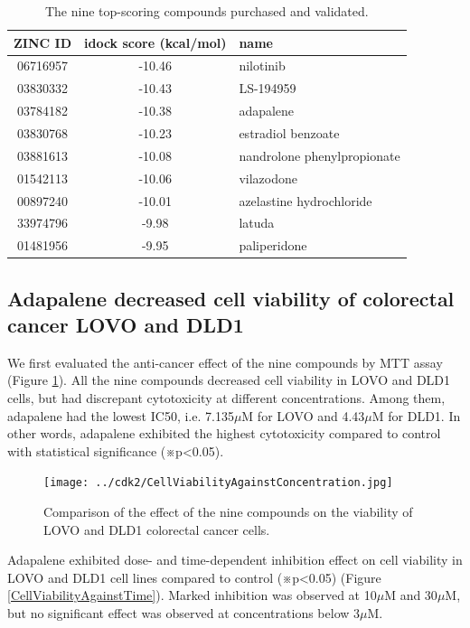 \documentclass[10pt]{article}
\begin{document}
\begin{table}
\caption{The nine top-scoring compounds purchased and validated.}
\label{Top9}
\begin{tabular}{ccl}
\hline
ZINC ID & idock score (kcal/mol) & name\\
\hline
06716957 & -10.46 & nilotinib\\
03830332 & -10.43 & LS-194959\\
03784182 & -10.38 & adapalene\\
03830768 & -10.23 & estradiol benzoate\\
03881613 & -10.08 & nandrolone phenylpropionate\\
01542113 & -10.06 & vilazodone\\
00897240 & -10.01 & azelastine hydrochloride\\
33974796 &  -9.98 & latuda\\
01481956 &  -9.95 & paliperidone\\
\hline
\end{tabular}
\end{table}

\subsection*{Adapalene decreased cell viability of colorectal cancer LOVO and DLD1}

We first evaluated the anti-cancer effect of the nine compounds by MTT assay (Figure \ref{CellViabilityAgainstConcentration}). All the nine compounds decreased cell viability in LOVO and DLD1 cells, but had discrepant cytotoxicity at different concentrations. Among them, adapalene had the lowest IC50, i.e. 7.135$\mu$M for LOVO and 4.43$\mu$M for DLD1. In other words, adapalene exhibited the highest cytotoxicity compared to control with statistical significance (※p<0.05).

\begin{figure}
\centering
\texttt{[image: ../cdk2/CellViabilityAgainstConcentration.jpg]}
\caption{Comparison of the effect of the nine compounds on the viability of LOVO and DLD1 colorectal cancer cells.}
\label{CellViabilityAgainstConcentration}
\end{figure}

Adapalene exhibited dose- and time-dependent inhibition effect on cell viability in LOVO and DLD1 cell lines compared to control (※p<0.05) (Figure \ref{CellViabilityAgainstTime}). Marked inhibition was observed at 10$\mu$M and 30$\mu$M, but no significant effect was observed at concentrations below 3$\mu$M.
\end{document}
